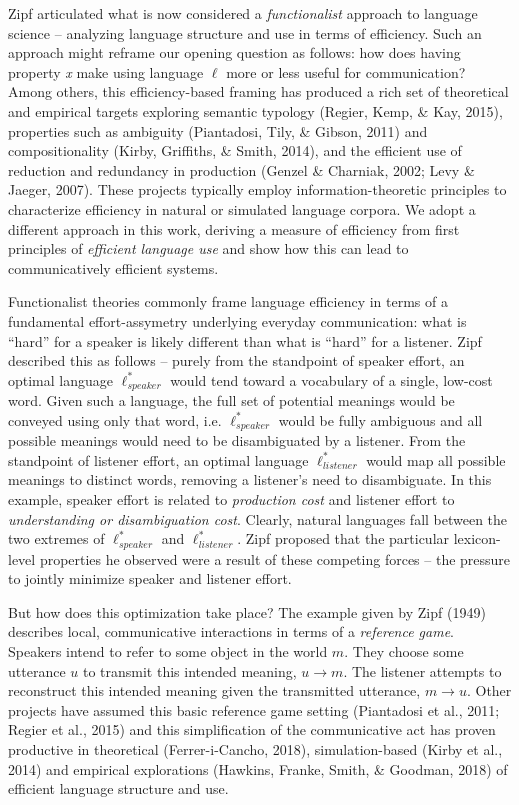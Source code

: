 \documentclass[10pt, letterpaper]{article}
\begin{document}
Zipf articulated what is now considered a \emph{functionalist} approach
to language science -- analyzing language structure and use in terms of
efficiency. Such an approach might reframe our opening question as
follows: how does having property \textit{x} make using language
\(\ell\) more or less useful for communication? Among others, this
efficiency-based framing has produced a rich set of theoretical and
empirical targets exploring semantic typology (Regier, Kemp, \& Kay,
2015), properties such as ambiguity (Piantadosi, Tily, \& Gibson, 2011)
and compositionality (Kirby, Griffiths, \& Smith, 2014), and the
efficient use of reduction and redundancy in production (Genzel \&
Charniak, 2002; Levy \& Jaeger, 2007). These projects typically employ
information-theoretic principles to characterize efficiency in natural
or simulated language corpora. We adopt a different approach in this
work, deriving a measure of efficiency from first principles of
\textit{efficient language use} and show how this can lead to
communicatively efficient systems.\par

Functionalist theories commonly frame language efficiency in terms of a
fundamental effort-assymetry underlying everyday communication: what is
``hard'' for a speaker is likely different than what is ``hard'' for a
listener. Zipf described this as follows -- purely from the standpoint
of speaker effort, an optimal language \(\ell_{speaker}^*\) would tend
toward a vocabulary of a single, low-cost word. Given such a language,
the full set of potential meanings would be conveyed using only that
word, i.e. \(\ell_{speaker}^*\) would be fully ambiguous and all
possible meanings would need to be disambiguated by a listener. From the
standpoint of listener effort, an optimal language \(\ell_{listener}^*\)
would map all possible meanings to distinct words, removing a listener's
need to disambiguate. In this example, speaker effort is related to
\emph{production cost} and listener effort to \emph{understanding or
disambiguation cost}. Clearly, natural languages fall between the two
extremes of \(\ell_{speaker}^*\) and \(\ell_{listener}^*\). Zipf
proposed that the particular lexicon-level properties he observed were a
result of these competing forces -- the pressure to jointly minimize
speaker and listener effort.\par

But how does this optimization take place? The example given by Zipf
(1949) describes local, communicative interactions in terms of a
\textit{reference game}. Speakers intend to refer to some object in the
world \(m\). They choose some utterance \(u\) to transmit this intended
meaning, \(u \rightarrow m\). The listener attempts to reconstruct this
intended meaning given the transmitted utterance, \(m \rightarrow u\).
Other projects have assumed this basic reference game setting
(Piantadosi et al., 2011; Regier et al., 2015) and this simplification
of the communicative act has proven productive in theoretical
(Ferrer-i-Cancho, 2018), simulation-based (Kirby et al., 2014) and
empirical explorations (Hawkins, Franke, Smith, \& Goodman, 2018) of
efficient language structure and use.\par
\end{document}
